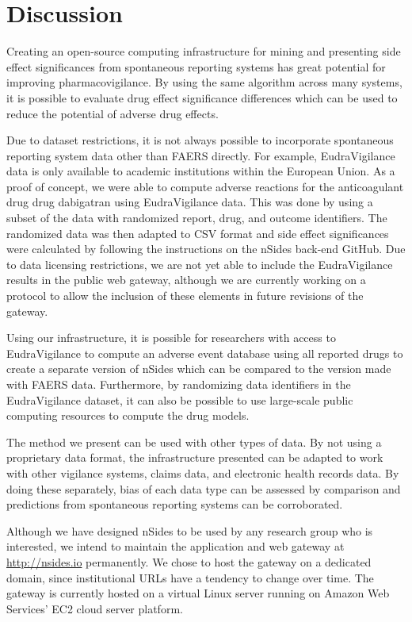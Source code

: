 \documentclass{ws-procs11x85}
\begin{document}
\section{Discussion}

Creating an open-source computing infrastructure for mining and
presenting side effect significances from spontaneous reporting
systems has great potential for improving pharmacovigilance. By using
the same algorithm across many systems, it is possible to evaluate
drug effect significance differences which can be used to reduce the
potential of adverse drug effects.

Due to dataset restrictions, it is not always possible to incorporate
spontaneous reporting system data other than FAERS directly. For
example, EudraVigilance data is only available to academic
institutions within the European Union.  As a proof of concept, we
were able to compute adverse reactions for the anticoagulant drug drug
dabigatran using EudraVigilance data. This was done by using a subset
of the data with randomized report, drug, and outcome identifiers. The
randomized data was then adapted to CSV format and side effect
significances were calculated by following the instructions on the
nSides back-end GitHub. Due to data licensing restrictions, we are not
yet able to include the EudraVigilance results in the public web
gateway, although we are currently working on a protocol to allow the
inclusion of these elements in future revisions of the gateway.

Using our infrastructure, it is possible for researchers with access
to EudraVigilance to compute an adverse event database using all
reported drugs to create a separate version of nSides which can be
compared to the version made with FAERS data. Furthermore, by
randomizing data identifiers in the EudraVigilance dataset, it can
also be possible to use large-scale public computing resources to
compute the drug models.

The method we present can be used with other types of data. By not
using a proprietary data format, the infrastructure presented can be
adapted to work with other vigilance systems, claims data, and
electronic health records data. By doing these separately, bias of
each data type can be assessed by comparison and predictions from
spontaneous reporting systems can be corroborated.

Although we have designed nSides to be used by any research group who
is interested, we intend to maintain the application and web gateway
at \url{http://nsides.io} permanently. We chose to host the gateway on
a dedicated domain, since institutional URLs have a tendency to change
over time. The gateway is currently hosted on a virtual Linux server
running on Amazon Web Services' EC2 cloud server platform.
\end{document}
